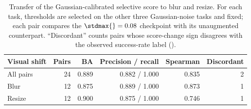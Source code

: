 \begin{table}[t]
\centering
\caption{Transfer of the Gaussian-calibrated selective score to blur and resize. For each task, thresholds are selected on the other three Gaussian-noise tasks and fixed; each pair compares the $\stdmax{}=0.08$ checkpoint with its unaugmented counterpart. ``Discordant'' counts pairs whose score-change sign disagrees with the observed success-rate label ().}
\label{tab:cross-stressor-selective-transfer}
\small
\setlength{\tabcolsep}{4pt}
\begin{tabular}{lrrrrr}
\toprule
Visual shift & Pairs & BA & Precision / recall & Spearman & Discordant \\
\midrule
All pairs & 24 & 0.889 & 0.882 / 1.000 & 0.835 & 2 \\
Blur & 12 & 0.875 & 0.889 / 1.000 & 0.873 & 1 \\
Resize & 12 & 0.900 & 0.875 / 1.000 & 0.746 & 1 \\
\bottomrule
\end{tabular}
\end{table}

